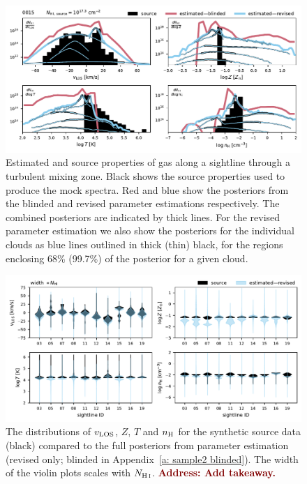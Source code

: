 \documentclass[fleqn,usenatbib]{mnras}
\newcommand{\todo}[1]{\textcolor{Maroon}{\textbf{Address: #1}}}
\begin{document}
\begin{figure}
    \centering
    \includegraphics[width=\textwidth]{figures/sample2/high-z/sightline_0015.pdf}
    \caption{
    Estimated and source properties of gas along a sightline through a turbulent mixing zone.
    Black shows the source properties used to produce the mock spectra.
    Red and blue show the posteriors from the blinded and revised parameter estimations respectively. 
    The combined posteriors are indicated by thick lines.
    For the revised parameter estimation we also show the posteriors for the individual clouds as blue lines outlined in thick (thin) black, for the regions enclosing 68\% (99.7\%) of the posterior for a given cloud.
    }
    \label{f: sample2 15}
\end{figure}

\begin{figure}
    \centering
    \includegraphics[width=\textwidth]{figures/sample2/violin_revised.pdf}
    \caption{
    The distributions of $v_{\rm LOS}$, $Z$, $T$ and $n_{\rm H}$ for the synthetic source data (black) compared to the full posteriors from parameter estimation (revised only; blinded in Appendix~\ref{a: sample2 blinded}).
    The width of the violin plots scales with $N_{\ion{H}{I}}$.
    \todo{Add takeaway.}
    }
    \label{f: sample2 violin}
\end{figure}
\end{document}
